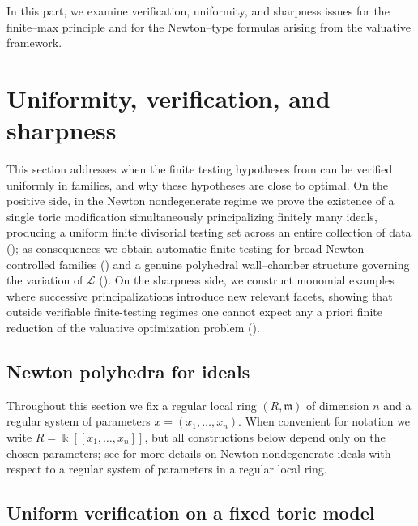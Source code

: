 \documentclass[12pt]{amsart}
\newcommand{\m}{\mathfrak m}
\newcommand{\Loj}{\mathcal{L}} %
\theoremstyle{plain}
\theoremstyle{definition}
\numberwithin{equation}{section}
\begin{document}
In this part, we examine verification, uniformity, and sharpness issues for the
finite--max principle and for the Newton--type formulas arising from the
valuative framework.


\section{Uniformity, verification, and sharpness}\label{sec:verification-uniformity-sharpness}

This section addresses when the finite testing hypotheses from  can be verified uniformly in families, and why these hypotheses are close to optimal.  On the positive side, in the Newton nondegenerate regime we prove the existence of a single toric modification simultaneously principalizing finitely many ideals, producing a uniform finite divisorial testing set across an entire collection of data (); as consequences we obtain automatic finite testing for broad Newton-controlled families () and a genuine polyhedral wall--chamber structure governing the variation of $\Loj$ ().  On the sharpness side, we construct monomial examples where successive principalizations introduce new relevant facets, showing that outside verifiable finite-testing regimes one cannot expect any a priori finite reduction of the valuative optimization problem ().

\subsection{Newton polyhedra for ideals}\label{subsec:newton-poly-ideal}

Throughout this section we fix a regular local ring $(R,\m)$ of dimension $n$
and a regular system of parameters $x=(x_1,\dots,x_n)$.  When convenient for
notation we write $R=\Bbbk[[x_1,\dots,x_n]]$, but all constructions below depend
only on the chosen parameters; see \cite{HNP25} for more details on Newton nondegenerate ideals with respect to a regular system of parameters in a regular local ring.


\subsection{Uniform verification on a fixed toric model}\label{subsec:uniform-verification}
\end{document}
